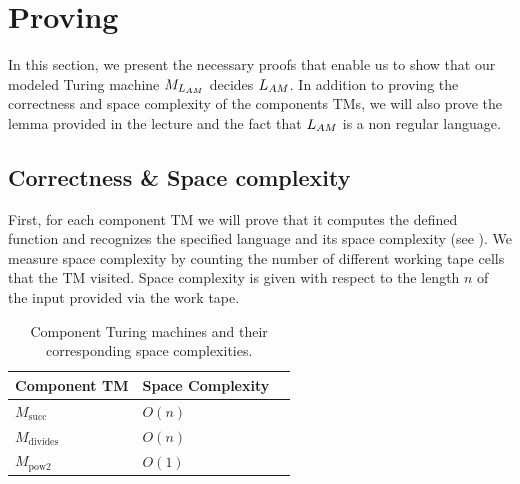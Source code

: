 \documentclass[UTF8]{article}
\renewcommand{\L}{{L_{\tiny{AM}}}}
\begin{document}
\section{Proving}

In this section, we present the necessary proofs that enable us to show that our modeled Turing machine $M_\L$ decides $\L$.
In addition to proving the correctness and space complexity of the components TMs, we will also prove the lemma provided in the lecture and the fact that $\L$ is a non regular language. 

\subsection{Correctness \& Space complexity}

First, for each component TM we will prove that it computes the defined function and recognizes the specified language and its space complexity (see ). 
We measure space complexity by counting the number of different working tape cells that the TM visited. 
Space complexity is given with respect to the length $n$ of the input provided via the work tape. 

\begin{table}[h]
    \centering
    \begin{tabular}{l|l|c}
        Component TM & Space Complexity \\
        \hline
        $M_{\operatorname{succ}}$ 
        & $O(n)$ \\

        $M_{\operatorname{divides}}$ & $O(n)$ \\

        $M_{\operatorname{pow2}}$ &
        $O(1)$ \\

    \end{tabular}
    \caption{Component Turing machines and their corresponding space complexities.}
    \label{tab:compTMsSpace}
\end{table}

\end{document}
